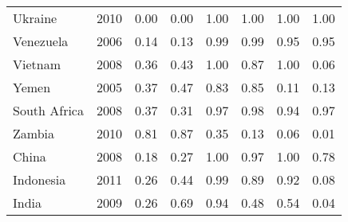 \begin{longtable}[t]{lrrrrrrr}
Ukraine & 2010 & 0.00 & 0.00 & 1.00 & 1.00 & 1.00 & 1.00\\
Venezuela & 2006 & 0.14 & 0.13 & 0.99 & 0.99 & 0.95 & 0.95\\
Vietnam & 2008 & 0.36 & 0.43 & 1.00 & 0.87 & 1.00 & 0.06\\
Yemen & 2005 & 0.37 & 0.47 & 0.83 & 0.85 & 0.11 & 0.13\\
South Africa & 2008 & 0.37 & 0.31 & 0.97 & 0.98 & 0.94 & 0.97\\
Zambia & 2010 & 0.81 & 0.87 & 0.35 & 0.13 & 0.06 & 0.01\\
China & 2008 & 0.18 & 0.27 & 1.00 & 0.97 & 1.00 & 0.78\\
Indonesia & 2011 & 0.26 & 0.44 & 0.99 & 0.89 & 0.92 & 0.08\\
India & 2009 & 0.26 & 0.69 & 0.94 & 0.48 & 0.54 & 0.04\\
\bottomrule
\end{longtable}